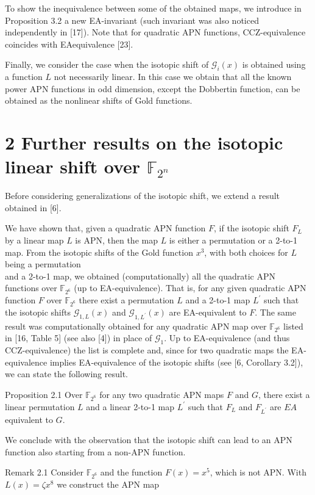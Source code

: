 \documentclass[10pt]{article}
\begin{document}
To show the inequivalence between some of the obtained maps, we introduce in Proposition 3.2 a new EA-invariant (such invariant was also noticed independently in [17]). Note that for quadratic APN functions, CCZ-equivalence coincides with EAequivalence [23].

Finally, we consider the case when the isotopic shift of $\mathscr{G}_{i}(x)$ is obtained using a function $L$ not necessarily linear. In this case we obtain that all the known power APN functions in odd dimension, except the Dobbertin function, can be obtained as the nonlinear shifts of Gold functions.

\section*{2 Further results on the isotopic linear shift over $\mathbb{F}_{2^{n}}$}
Before considering generalizations of the isotopic shift, we extend a result obtained in [6].

We have shown that, given a quadratic APN function $F$, if the isotopic shift $F_{L}$ by a linear map $L$ is APN, then the map $L$ is either a permutation or a 2-to-1 map. From the isotopic shifts of the Gold function $x^{3}$, with both choices for $L$ being a permutation\\
and a 2-to-1 map, we obtained (computationally) all the quadratic APN functions over $\mathbb{F}_{2^{6}}$ (up to EA-equivalence). That is, for any given quadratic APN function $F$ over $\mathbb{F}_{2^{6}}$ there exist a permutation $L$ and a 2-to-1 map $L^{\prime}$ such that the isotopic shifts $\mathscr{G}_{1, L}(x)$ and $\mathscr{G}_{1, L^{\prime}}(x)$ are EA-equivalent to $F$. The same result was computationally obtained for any quadratic APN map over $\mathbb{F}_{2^{6}}$ listed in [16, Table 5] (see also [4]) in place of $\mathscr{G}_{1}$. Up to EA-equivalence (and thus CCZ-equivalence) the list is complete and, since for two quadratic maps the EA-equivalence implies EA-equivalence of the isotopic shifts (see [6, Corollary 3.2]), we can state the following result.

Proposition 2.1 Over $\mathbb{F}_{2^{6}}$ for any two quadratic APN maps $F$ and $G$, there exist a linear permutation $L$ and a linear 2-to-1 map $L^{\prime}$ such that $F_{L}$ and $F_{L^{\prime}}$ are $E A$ equivalent to $G$.

We conclude with the observation that the isotopic shift can lead to an APN function also starting from a non-APN function.

Remark 2.1 Consider $\mathbb{F}_{2^{6}}$ and the function $F(x)=x^{5}$, which is not APN. With $L(x)= \zeta x^{8}$ we construct the APN map
\end{document}
